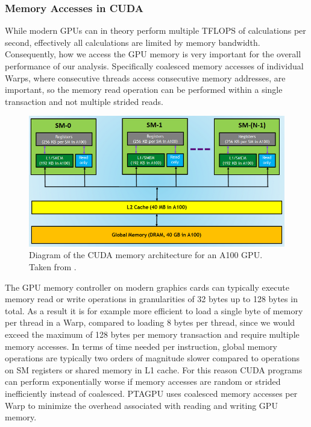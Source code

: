 \subsubsection{Memory Accesses in CUDA}
While modern GPUs can in theory perform multiple TFLOPS of calculations per second, effectively all calculations are limited by memory bandwidth.
Consequently, how we access the GPU memory is very important for the overall performance of our analysis. Specifically coalesced memory accesses of individual Warps, where consecutive threads access consecutive memory addresses, are important, so the memory read operation can be performed within a single transaction and not multiple strided reads.
\begin{figure}
    \centering
    \includegraphics[width=.7\textwidth]{img/cuda.png}
    \caption[Diagram of the CUDA memory architecture for an A100]{Diagram of the CUDA memory architecture for an A100 GPU.\\Taken from \cite{cudarefresher}.}
    \label{fig:cuda-arch}
\end{figure}
The GPU memory controller on modern graphics cards can typically execute memory read or write operations in granularities of 32 bytes up to 128 bytes in total.
As a result it is for example more efficient to load a single byte of memory per thread in a Warp, compared to loading 8 bytes per thread, since we would exceed the maximum of 128 bytes per memory transaction and require multiple memory accesses.
In terms of time needed per instruction, global memory operations are typically two orders of magnitude slower compared to operations on SM registers or shared memory in L1 cache. For this reason CUDA programs can perform exponentially worse if memory accesses are random or strided inefficiently instead of coalesced.
PTAGPU uses coalesced memory accesses per Warp to minimize the overhead associated with reading and writing GPU memory.

